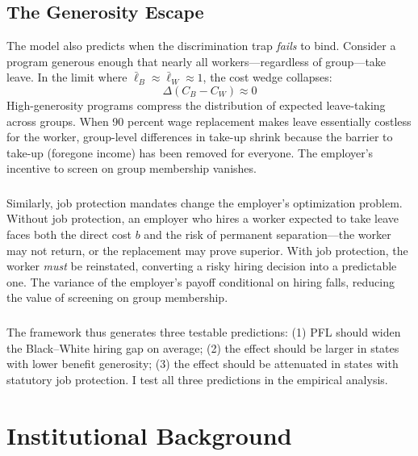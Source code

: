 \documentclass[12pt]{article}
\begin{document}
\subsection{The Generosity Escape}

The model also predicts when the discrimination trap \textit{fails} to bind. Consider a program generous enough that nearly all workers---regardless of group---take leave. In the limit where $\bar{\ell}_B \approx \bar{\ell}_W \approx 1$, the cost wedge collapses:
\begin{equation}
    \Delta(C_B - C_W) \approx 0
\end{equation}
High-generosity programs compress the distribution of expected leave-taking across groups. When 90 percent wage replacement makes leave essentially costless for the worker, group-level differences in take-up shrink because the barrier to take-up (foregone income) has been removed for everyone. The employer's incentive to screen on group membership vanishes.

\subsubsection*{}
Similarly, job protection mandates change the employer's optimization problem. Without job protection, an employer who hires a worker expected to take leave faces both the direct cost $b$ and the risk of permanent separation---the worker may not return, or the replacement may prove superior. With job protection, the worker \textit{must} be reinstated, converting a risky hiring decision into a predictable one. The variance of the employer's payoff conditional on hiring falls, reducing the value of screening on group membership.

\subsubsection*{}
The framework thus generates three testable predictions: (1) PFL should widen the Black--White hiring gap on average; (2) the effect should be larger in states with lower benefit generosity; (3) the effect should be attenuated in states with statutory job protection. I test all three predictions in the empirical analysis.


\section{Institutional Background}
\end{document}
